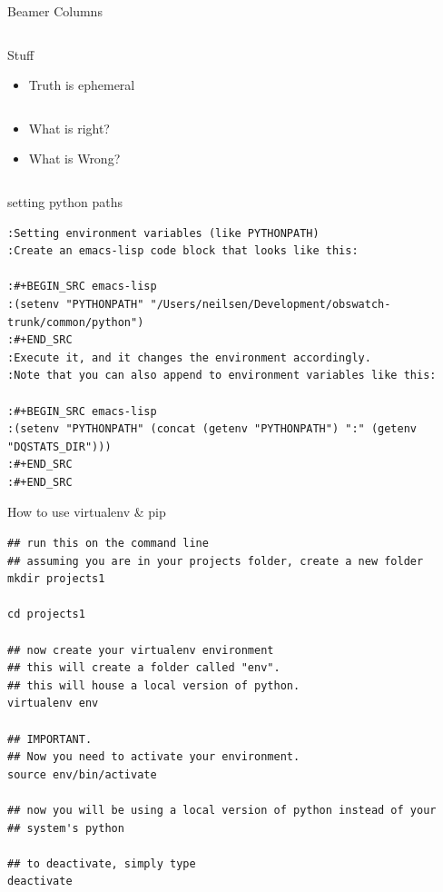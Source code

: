 \documentclass[presentation]{beamer}
\begin{document}
\begin{frame}[label=sec-8-1-2]{Beamer Columns}
\begin{columns}
\begin{column}{0.5\textwidth}
\end{column}
\end{columns}
\begin{block}{Stuff}
\begin{itemize}
\item Truth is ephemeral
\end{itemize}
\end{block}


\begin{columns}
\begin{column}{0.5\textwidth}
\begin{itemize}
\item What is right?
\item What is Wrong?
\end{itemize}
\end{column}
\end{columns}
\end{frame}



\begin{frame}[fragile,label=sec-9-0-1]{setting python paths}
 \begin{verbatim}
:Setting environment variables (like PYTHONPATH)
:Create an emacs-lisp code block that looks like this:

:#+BEGIN_SRC emacs-lisp
:(setenv "PYTHONPATH" "/Users/neilsen/Development/obswatch-trunk/common/python")
:#+END_SRC
:Execute it, and it changes the environment accordingly.
:Note that you can also append to environment variables like this:

:#+BEGIN_SRC emacs-lisp
:(setenv "PYTHONPATH" (concat (getenv "PYTHONPATH") ":" (getenv "DQSTATS_DIR")))
:#+END_SRC
:#+END_SRC
\end{verbatim}
\end{frame}



\begin{frame}[fragile,label=sec-9-0-2]{How to use virtualenv \& pip}
 \lstset{numbers=left,language=sh,label= ,caption= }
\begin{lstlisting}
## run this on the command line
## assuming you are in your projects folder, create a new folder
mkdir projects1 

cd projects1

## now create your virtualenv environment
## this will create a folder called "env". 
## this will house a local version of python. 
virtualenv env 

## IMPORTANT. 
## Now you need to activate your environment. 
source env/bin/activate

## now you will be using a local version of python instead of your
## system's python

## to deactivate, simply type
deactivate
\end{lstlisting}
\end{frame}
\end{document}
